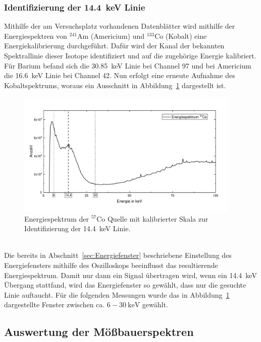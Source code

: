 \documentclass[a4paper,twoside,final]{article}
\begin{document}
\subsubsection{Identifizierung der \SI{14,4}{\kilo\electronvolt} Linie}
Mithilfe der am Versuchsplatz vorhandenen Datenblätter wird mithilfe der Energiespektren von $^{241}$Am (Americium) und $^{133}$Co (Kobalt) eine Energiekalibrierung durchgeführt. Dafür wird der Kanal der bekannten Spektrallinie dieser Isotope identifiziert und auf die zugehörige Energie kalibriert. Für Barium befand sich die \SI{30,85}{\kilo\electronvolt} Linie bei Channel 97 und bei Americium die \SI{16,6}{\kilo\electronvolt} Linie bei Channel 42. Nun erfolgt eine erneute Aufnahme des Kobaltspektrums, woraus ein Ausschnitt in Abbildung~\ref{fig:Spektrum_Co} dargestellt ist.
\begin{figure}[htp]
    \vspace{-0.5cm}
    \centering
    \includegraphics[width=0.95\textwidth]{Bilder/Energiespektrum_Co_kalibriert.pdf}
    \caption{Energiespektrum der $^{57}$Co Quelle mit kalibrierter Skala zur Identifizierung der \SI{14,4}{\kilo\electronvolt} Linie.}
    \label{fig:Spektrum_Co}
\end{figure}\\
Die bereits in Abschnitt~\ref{sec:Energiefenster} beschriebene Einstellung des Energiefensters mithilfe des Oszilloskops beeinflusst das resultierende Energiespektrum. Damit nur dann ein Signal übertragen wird, wenn ein \SI{14,4}{\kilo\electronvolt} Übergang stattfand, wird das Energiefenster so gewählt, dass nur die gesuchte Linie auftaucht. Für die folgenden Messungen wurde das in Abbildung~\ref{fig:Spektrum_Co} dargestellte Fenster zwischen ca. $6-\SI{30}{\kilo\electronvolt}$ gewählt.

\subsection{Auswertung der Mößbauerspektren}
\end{document}
